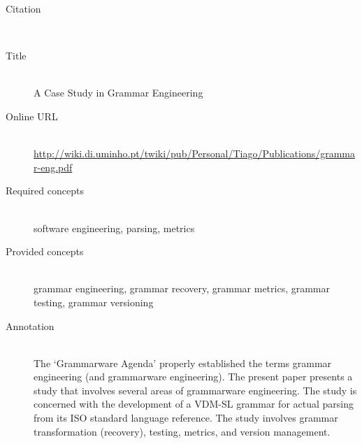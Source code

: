 \begin{description}
\item[Citation]\mbox{}\\
\cite{AlvesV09}
\item[Title]\mbox{}\\
A Case Study in Grammar Engineering
\item[Online URL]\mbox{}\\
{\footnotesize\url{http://wiki.di.uminho.pt/twiki/pub/Personal/Tiago/Publications/grammar-eng.pdf}}
\item[Required concepts]\mbox{}\\
software engineering, parsing, metrics\item[Provided concepts]\mbox{}\\
grammar engineering, grammar recovery, grammar metrics, grammar testing, grammar versioning\item[Annotation]\mbox{}\\
The `Grammarware Agenda' \cite{KlintLV05} properly established the terms grammar engineering (and grammarware engineering). The present paper presents a study that involves several areas of grammarware engineering. The study is concerned with the development of a VDM-SL grammar for actual parsing from its ISO standard language reference. The study involves grammar transformation (recovery), testing, metrics, and version management.
\end{description}

